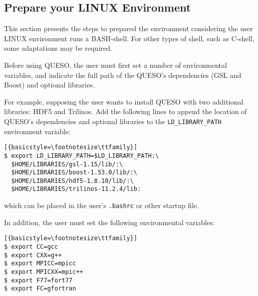 


\subsection{Prepare your LINUX Environment}\label{sec:prepare}


This section presents the steps to prepared the environment
considering the user LINUX environment runs a BASH-shell. For other types of shell, such as C-shell, some adaptations may be required.

Before using QUESO, the user must first set a number of environmental variables, and indicate the full path
of the QUESO's dependencies (GSL and Boost) and optional libraries. 

For example, supposing the user wants to install QUESO with two additional libraries: HDF5 and Trilinos. 
Add the following lines to append the location of QUESO's dependencies and optional libraries to the \verb+LD_LIBRARY_PATH+ environment variable:
%
\begin{lstlisting}[{basicstyle=\footnotesize\ttfamily}]
$ export LD_LIBRARY_PATH=$LD_LIBRARY_PATH:\
  $HOME/LIBRARIES/gsl-1.15/lib/:\
  $HOME/LIBRARIES/boost-1.53.0/lib/:\
  $HOME/LIBRARIES/hdf5-1.8.10/lib/:\
  $HOME/LIBRARIES/trilinos-11.2.4/lib:
\end{lstlisting}
which can be placed in the user's \verb+.bashrc+ or other startup file. 

In addition, the user must set the following environmental
variables:
\begin{lstlisting}[{basicstyle=\footnotesize\ttfamily}]
$ export CC=gcc
$ export CXX=g++
$ export MPICC=mpicc
$ export MPICXX=mpic++
$ export F77=fort77
$ export FC=gfortran
\end{lstlisting}



